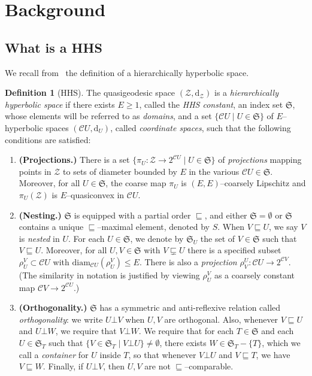 \documentclass[svgnames]{amsart}
\theoremstyle{plain}
\theoremstyle{definition}
\newtheorem{defn}[thm]{Definition}
\newcommand{\frakS}{\mathfrak S}
\newcommand{\diam}{\mathrm{diam}}
\newcommand{\C}{\mathcal C}
\newcommand{\dist}{\mathrm{d}}
\newcommand{\nest}{\sqsubseteq}
\newcommand{\propnest}{\sqsubsetneq}
\newcommand{\orth}{\bot}
\newcommand{\cuco}[1]{{\mathcal #1}}
\begin{document}
\section{Background}\label{sec:HHG/S}

\subsection{What is a HHS}\label{subsec:axioms}
We recall from~\cite{HHS_II} the definition of a hierarchically hyperbolic space.
\begin{defn}[HHS]\label{defn:HHS}
The quasigeodesic space  $( \cuco Z,\dist_{\cuco Z})$ is a \emph{hierarchically hyperbolic space} if there exists $E\geq1$, called the \emph{HHS constant}, an index set $\frakS$, whose elements will be referred to as \emph{domains}, and a set $\{\C  U\mid U\in\frakS\}$ of $E$--hyperbolic spaces $(\C  U,\dist_U)$, called \emph{coordinate spaces},  such that the following conditions are satisfied:
\begin{enumerate}
\item\textbf{(Projections.)}\label{item:dfs_curve_complexes}
There is a set $\{\pi_U:  \cuco Z\rightarrow 2^{\C  U}\mid U\in\frakS\}$ of \emph{projections} mapping points in $ \cuco Z$ to sets of diameter bounded by $E$ in the various $\C  U\in\frakS$. Moreover, for all $U\in\frakS$, the coarse map $\pi_U$ is $(E,E)$--coarsely Lipschitz and $\pi_U( \cuco Z)$ is $E$--quasiconvex in $\C  U$.

\item \textbf{(Nesting.)} \label{item:dfs_nesting}
$\frakS$ is equipped with a partial order $\nest$, and either $\frakS=\emptyset$ or $\frakS$ contains a unique $\nest$--maximal element, denoted by $S$. When $V\nest U$, we say $V$ is \emph{nested} in $U$. For each $U\in\frakS$, we denote by $\frakS_U$ the set of $V\in\frakS$ such that $V\nest U$. Moreover, for all $U,V\in\frakS$ with $V\propnest U$ there is a specified subset $\rho^V_U\subset\C  U$ with $\diam_{\C  U}(\rho^V_U)\leq E$. There is also a \emph{projection} $\rho^U_V: \C U\rightarrow 2^{\C V}$. (The similarity in notation is justified by viewing $\rho^V_U$ as a coarsely constant map $\C V\rightarrow 2^{\C  U}$.)
 
\item \textbf{(Orthogonality.)} \label{item:dfs_orthogonal}
$\frakS$ has a symmetric and anti-reflexive relation called \emph{orthogonality}: we write $U\orth V$ when $U,V$ are orthogonal. Also, whenever $V\nest U$ and $U\orth W$, we require that $V\orth W$. We require that for each $T\in\frakS$ and each $U\in\frakS_T$ such that $\{V\in\frakS_T\mid V\orth U\}\neq\emptyset$, there exists $W\in\frakS_T-\{T\}$, which we call a \emph{container} for $U$ inside $T$, so that whenever $V\orth U$ and $V\nest T$, we have $V\nest W$. Finally, if $U \orth V$, then $U,V$ are not $\nest$--comparable.


\end{enumerate}
\end{defn}
\end{document}
